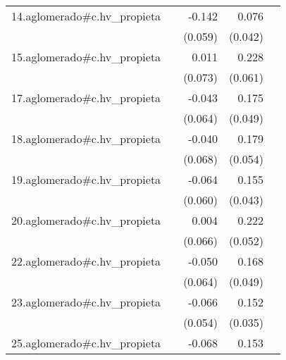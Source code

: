 {\begin{longtable}{l*{4}{D{.}{.}{-1}}}
\addlinespace
14.aglomerado#c.hv\_propieta&                     &      -0.142\sym{*}  &       0.076         &                     \\
            &                     &     (0.059)         &     (0.042)         &                     \\
\addlinespace
15.aglomerado#c.hv\_propieta&                     &       0.011         &       0.228\sym{***}&                     \\
            &                     &     (0.073)         &     (0.061)         &                     \\
\addlinespace
17.aglomerado#c.hv\_propieta&                     &      -0.043         &       0.175\sym{***}&                     \\
            &                     &     (0.064)         &     (0.049)         &                     \\
\addlinespace
18.aglomerado#c.hv\_propieta&                     &      -0.040         &       0.179\sym{***}&                     \\
            &                     &     (0.068)         &     (0.054)         &                     \\
\addlinespace
19.aglomerado#c.hv\_propieta&                     &      -0.064         &       0.155\sym{***}&                     \\
            &                     &     (0.060)         &     (0.043)         &                     \\
\addlinespace
20.aglomerado#c.hv\_propieta&                     &       0.004         &       0.222\sym{***}&                     \\
            &                     &     (0.066)         &     (0.052)         &                     \\
\addlinespace
22.aglomerado#c.hv\_propieta&                     &      -0.050         &       0.168\sym{***}&                     \\
            &                     &     (0.064)         &     (0.049)         &                     \\
\addlinespace
23.aglomerado#c.hv\_propieta&                     &      -0.066         &       0.152\sym{***}&                     \\
            &                     &     (0.054)         &     (0.035)         &                     \\
\addlinespace
25.aglomerado#c.hv\_propieta&                     &      -0.068         &       0.153\sym{**} &                     \\

\end{longtable}}
